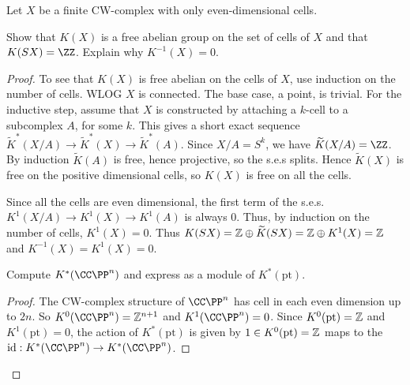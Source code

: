 \documentclass{article}
\begin{document}
 Let $X$ be a finite CW-complex with only even-dimensional cells.
\begin{enumerate}[a.]
\item Show that $K(X)$ is a free abelian group on the set of cells of $X$ and that $K(SX) = \ZZ$.  Explain why $K^{-1}(X) = 0$.
\begin{proof}
To see that $K(X)$ is free abelian on the cells of $X$, use induction on the number of cells. WLOG $X$ is connected. The base case, a point, is trivial.  For the inductive step, assume that $X$ is constructed by attaching a $k$-cell to a subcomplex $A$, for some $k$. This gives a short exact sequence
$\widetilde K^*(X/A) \to \widetilde  K^*(X) \to \widetilde  K^*(A)$.  
Since $X/A = S^k$, we have $\widetilde  K(X/A) = \ZZ$. By induction $\widetilde K(A)$ is free, hence projective, so the s.e.s splits.  Hence $\widetilde K(X)$ is free on the positive dimensional cells, so $K(X)$ is free on all the cells.


Since all the cells are even dimensional, the first term of the s.e.s. 
$K^1(X/A) \to K^1(X) \to K^1(A)$ is always 0. Thus, by induction on the number of cells, $K^1(X) = 0$. Thus $K(SX) = \mathbb{Z} \oplus \widetilde K(SX) = \mathbb{Z} \oplus K^1(X) = \mathbb{Z}$ and $K^{-1}(X) = K^1(X) = 0$.

\item Compute $K^*(\CC\PP^n)$ and express as a module of $K^*(\text{pt})$.
\begin{proof}
The CW-complex structure of $\CC\PP^n$ has cell in each even dimension up to $2n$. So $K^0(\CC\PP^n) = \Z^{n+1}$ and $K^1(\CC\PP^n) = 0$.  Since $K^0(\text{pt}) = \mathbb{Z}$ and $K^1(\text{pt}) = 0$,  the action of $K^*(\text{pt})$ is given by $1 \in K^0(\text{pt}) = \mathbb{Z}$ maps to the $\id:K^*(\CC\PP^n) \to K^*(\CC\PP^n)$.
\end{proof}
\end{proof}


\end{enumerate}
\end{document}
